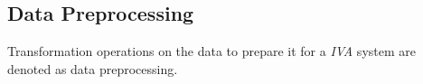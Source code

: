 \documentclass[journal]{style/vgtc} 			          %
\begin{document}
% 

\subsection{Data Preprocessing} \label{Data Preprocessing}
Transformation operations on the data to prepare it for a \emph{IVA} system are denoted as data preprocessing.
\end{document}
